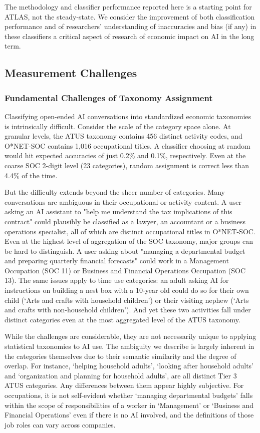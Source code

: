 \documentclass[11pt,a4paper]{article}
\begin{document}
The methodology and classifier performance reported here is a starting point for ATLAS, not the steady-state.  We consider the improvement of both classification performance and of researchers’ understanding of inaccuracies and bias (if any) in these classifiers a critical aspect of research of economic impact on AI in the long term. 

\subsection{Measurement Challenges}
\subsubsection{Fundamental Challenges of Taxonomy Assignment}
Classifying open-ended AI conversations into standardized economic taxonomies is intrinsically difficult. Consider the scale of the category space alone. At granular levels, the ATUS taxonomy contains 456 distinct activity codes, and O*NET-SOC contains 1,016 occupational titles. A classifier choosing at random would hit expected accuracies of just 0.2\% and 0.1\%, respectively. Even at the coarse SOC 2-digit level (23 categories), random assignment is correct less than 4.4\% of the time.

But the difficulty extends beyond the sheer number of categories. Many conversations are ambiguous in their occupational or activity content. A user asking an AI assistant to "help me understand the tax implications of this contract" could plausibly be classified as a lawyer, an accountant or a business operations specialist, all of which are distinct occupational titles in O*NET-SOC. Even at the highest level of aggregation of the SOC taxonomy, major groups can be hard to distinguish. A user asking about "managing a departmental budget and preparing quarterly financial forecasts" could work in a Management Occupation (SOC 11) or Business and Financial Operations Occupation (SOC 13). The same issues apply to time use categories: an adult asking AI for instructions on building a nest box with a 10-year old could do so for their own child (`Arts and crafts with household children') or their visiting nephew (`Arts and crafts with non-household children'). And yet these two activities fall under distinct categories even at the most aggregated level of the ATUS taxonomy.

While the challenges are considerable, they are not necessarily unique to applying statistical taxonomies to AI use. The ambiguity we describe is largely inherent in the categories themselves due to their semantic similarity and the degree of overlap. For instance, `helping household adults', `looking after household adults' and `organization and planning for household adults', are all distinct Tier 3 ATUS categories. Any differences between them appear highly subjective. For occupations, it is not self-evident whether `managing departmental budgets' falls within the scope of responsibilities of a worker in `Management' or `Business and Financial Operations' even if there is no AI involved, and the definitions of those job roles can vary across companies.
\end{document}
